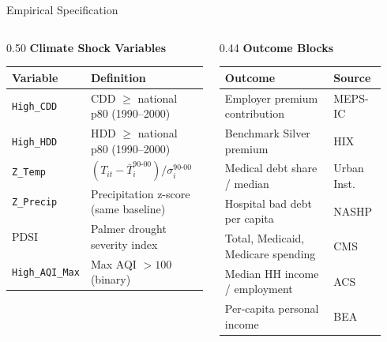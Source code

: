 \documentclass[aspectratio=169,11pt]{beamer}
\newcommand{\tealtext}[1]{{\color{Teal}#1}}
\begin{document}
\begin{frame}[shrink=6]{Empirical Specification}
\begin{columns}[T]
\begin{column}{0.50\textwidth}
      \textbf{\tealtext{Climate Shock Variables}}\\[0.2em]
      \scriptsize
      \begin{tabular}{ll}
        \toprule
        Variable & Definition \\
        \midrule
        \texttt{High\_CDD} & CDD $\geq$ national p80 (1990--2000) \\
        \texttt{High\_HDD} & HDD $\geq$ national p80 (1990--2000) \\
        \texttt{Z\_Temp}   & $(T_{it} - \bar{T}_i^{90\text{-}00})/\sigma_i^{90\text{-}00}$ \\
        \texttt{Z\_Precip} & Precipitation z-score (same baseline) \\
        PDSI               & Palmer drought severity index \\
        \texttt{High\_AQI\_Max} & Max AQI $> 100$ (binary) \\
        \bottomrule
      \end{tabular}
    \end{column}
    \begin{column}{0.44\textwidth}
      \textbf{\tealtext{Outcome Blocks}}\\[0.2em]
      \tiny
      \begin{tabular}{@{}>{\raggedright\arraybackslash}p{0.63\linewidth}>{\raggedright\arraybackslash}p{0.24\linewidth}@{}}
        \toprule
        Outcome & Source \\
        \midrule
        Employer premium contribution & MEPS-IC \\
        Benchmark Silver premium & HIX \\
        Medical debt share / median & Urban Inst. \\
        Hospital bad debt per capita & NASHP \\
        Total, Medicaid, Medicare spending & CMS \\
        Median HH income / employment & ACS \\
        Per-capita personal income & BEA \\
        \bottomrule
      \end{tabular}
    \end{column}
  \end{columns}
\end{frame}
\end{document}
